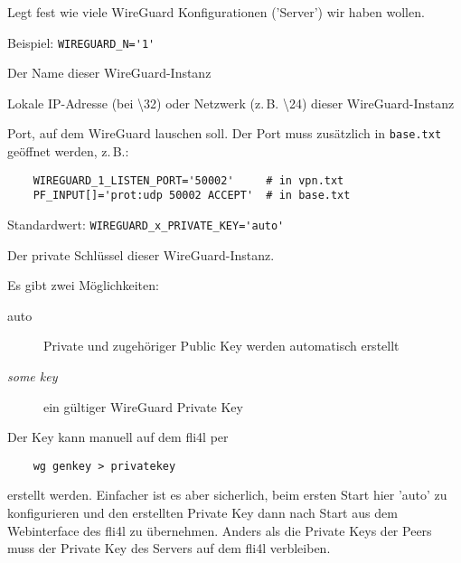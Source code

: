 \begin{description}


Legt fest wie viele WireGuard Konfigurationen ('Server') wir haben wollen.

Beispiel: \verb+WIREGUARD_N='1'+



Der Name dieser WireGuard-Instanz



Lokale IP-Adresse (bei \textbackslash32) oder Netzwerk (z.\,B. \textbackslash24)
dieser WireGuard-Instanz



Port, auf dem WireGuard lauschen soll. Der Port muss zusätzlich in \texttt{base.txt} geöffnet
werden, z.\,B.:

\begin{example}
\begin{verbatim}
    WIREGUARD_1_LISTEN_PORT='50002'     # in vpn.txt
    PF_INPUT[]='prot:udp 50002 ACCEPT'  # in base.txt
\end{verbatim}
\end{example}



Standardwert: \verb+WIREGUARD_x_PRIVATE_KEY='auto'+

Der private Schlüssel dieser WireGuard-Instanz.

Es gibt zwei Möglichkeiten:

\begin{description}
    \item[auto] Private und zugehöriger Public Key werden automatisch erstellt
    \item[\textit{some key}] ein gültiger WireGuard Private Key
\end{description}

Der Key kann manuell auf dem fli4l per

\begin{example}
\begin{verbatim}
    wg genkey > privatekey
\end{verbatim}
\end{example}

erstellt werden. Einfacher ist es aber sicherlich, beim ersten Start hier 'auto' zu
konfigurieren und den erstellten Private Key dann nach Start aus dem Webinterface
des fli4l zu übernehmen. Anders als die Private Keys der Peers muss der Private Key 
des Servers auf dem fli4l verbleiben.

\end{description}


